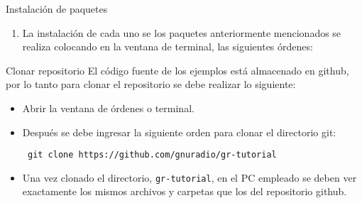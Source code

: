 
\begin{frame}{Instalación de paquetes}
\begin{enumerate}[1.]
\item La instalación de cada uno se los paquetes anteriormente mencionados se realiza colocando en la ventana de terminal, las siguientes órdenes:
\end{enumerate}



\end{frame}



\begin{frame}{Clonar repositorio}
El código fuente de los ejemplos está almacenado en github, por lo tanto para clonar el repositorio se debe realizar lo siguiente:
\begin{itemize}
\item Abrir la ventana de órdenes o terminal.
\item Después se debe ingresar la siguiente orden para clonar el directorio git:

\begin{block}{}
  \texttt{
    git clone https://github.com/gnuradio/gr-tutorial}
  \end{block}

\item Una vez clonado el directorio, {\tt gr-tutorial}, en el PC empleado se deben ver exactamente los mismos archivos y carpetas que los del repositorio github.
\end{itemize}
\end{frame}


